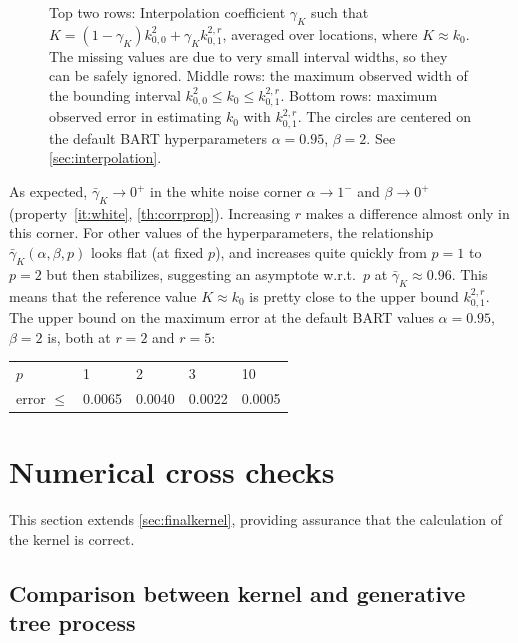 \documentclass[a4paper]{article}
\theoremstyle{definition}
\newcommand{\widecenter}[1]{\noindent\hspace{-\textwidth}\makebox[3\textwidth][c]{#1}}
\newcommand{\includempl}[1]{\texttt{[image: \#1]}}
\begin{document}
    \begin{figure}
        
        \centering
        \widecenter{\includempl{testnd2-plot2}}
        
        \caption{\label{fig:gamma} Top two rows: Interpolation coefficient $\gamma_K$ such that $K = (1-\gamma_K) k^{2}_{0,0} + \gamma_K k^{2,r}_{0,1}$, averaged over locations, where $K \approx k_0$. The missing values are due to very small interval widths, so they can be safely ignored. Middle rows: the maximum observed width of the bounding interval $k^2_{0,0} \le k_0 \le k^{2,r}_{0,1}$. Bottom rows: maximum observed error in estimating $k_0$ with $k^{2,r}_{0,1}$. The circles are centered on the default BART hyperparameters $\alpha=0.95$, $\beta=2$. See \autoref{sec:interpolation}.}
        
    \end{figure}
    
    As expected, $\bar\gamma_K \to 0^+$ in the white noise corner $\alpha \to 1^-$ and $\beta \to 0^+$ (property~\ref{it:white}, \autoref{th:corrprop}). Increasing $r$ makes a difference almost only in this corner. For other values of the hyperparameters, the relationship $\bar\gamma_K(\alpha,\beta,p)$ looks flat (at fixed $p$), and increases quite quickly from $p=1$ to $p=2$ but then stabilizes, suggesting an asymptote w.r.t.\ $p$ at $\bar\gamma_K\approx0.96$. This means that the reference value $K\approx k_0$ is pretty close to the upper bound $k^{2,r}_{0,1}$. The upper bound on the maximum error at the default BART values $\alpha=0.95$, $\beta=2$ is, both at $r=2$ and $r=5$:
    \begin{center}
        \begin{tabular}{l|*4l}
            $p$ & 1 & 2 & 3 & 10 \\
            error $\le$ & 0.0065 & 0.0040 & 0.0022 & 0.0005
        \end{tabular}
    \end{center}

    \section{Numerical cross checks}
    \label{sec:crosschecks}

    This section extends \autoref{sec:finalkernel}, providing assurance that the calculation of the kernel is correct.
    
    \subsection{Comparison between kernel and generative tree process}
    \label{sec:checkprior}
    
\end{document}
